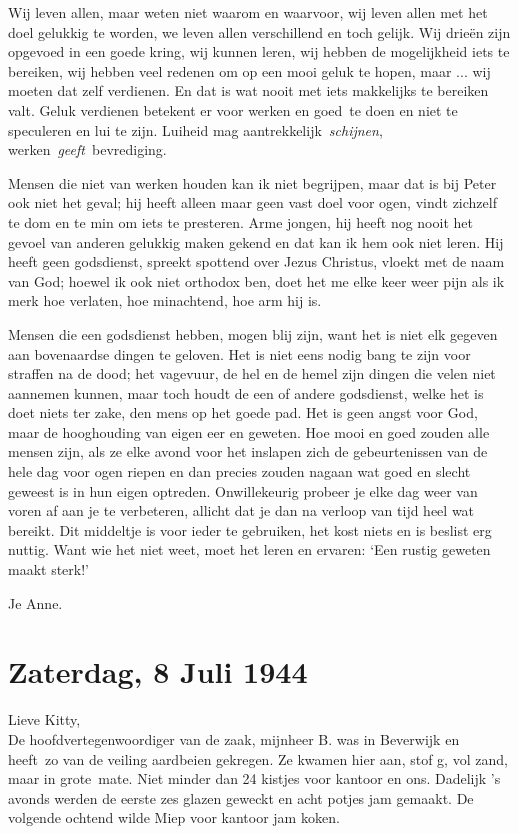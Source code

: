 \documentclass{book}
\begin{document}
Wij leven allen, maar weten niet waarom en waarvoor, wij leven allen met het
doel gelukkig te worden, we leven allen verschillend en toch gelijk.  Wij drieën
zijn opgevoed in een goede kring, wij kunnen leren, wij hebben de mogelijkheid
iets te bereiken, wij hebben veel redenen om op een mooi geluk te hopen, maar
... wij moeten dat zelf verdienen. En dat is wat nooit met iets makkelijks te
bereiken valt. Geluk verdienen betekent er voor werken en goed~te doen en niet
te speculeren en lui te zijn. Luiheid mag aantrekkelijk~\emph{schijnen},
werken~\emph{geeft}~bevrediging.

Mensen die niet van werken houden kan ik niet begrijpen, maar dat is bij Peter
ook niet het geval; hij heeft alleen maar geen vast doel voor ogen, vindt
zichzelf te dom en te min om iets te presteren. Arme jongen, hij heeft nog nooit
het gevoel van anderen gelukkig maken gekend en dat kan ik hem ook niet leren.
Hij heeft geen godsdienst, spreekt spottend over Jezus Christus, vloekt met de
naam van God; hoewel ik ook niet orthodox ben, doet het me elke keer weer pijn
als ik merk hoe verlaten, hoe minachtend, hoe arm hij is.

Mensen die een godsdienst hebben, mogen blij zijn, want het is niet elk gegeven
aan bovenaardse dingen te geloven. Het is niet eens nodig bang te zijn voor
straffen na de dood; het vagevuur, de hel en de hemel zijn dingen die velen niet
aannemen kunnen, maar toch houdt de een of andere godsdienst, welke het is doet
niets ter zake, den mens op het goede pad.  Het is geen angst voor God, maar de
hooghouding van eigen eer en geweten. Hoe mooi en goed zouden alle mensen zijn,
als ze elke avond voor het inslapen zich de gebeurtenissen van de hele dag voor
ogen riepen en dan precies zouden nagaan wat goed en slecht geweest is in hun
eigen optreden. Onwillekeurig probeer je elke dag weer van voren af aan je te
verbeteren, allicht dat je dan na verloop van tijd heel wat bereikt. Dit
middeltje is voor ieder te gebruiken, het kost niets en is beslist erg nuttig.
Want wie het niet weet, moet het leren en ervaren: `Een rustig geweten maakt
sterk!'

Je Anne.

\section*{Zaterdag, 8 Juli 1944}

Lieve Kitty,\\
De hoofdvertegenwoordiger van de zaak, mijnheer B. was in
Beverwijk en heeft~zo van de veiling aardbeien gekregen. Ze kwamen hier aan,
stof g, vol zand, maar in grote~mate. Niet minder dan 24 kistjes voor kantoor en
ons. Dadelijk 's avonds werden de eerste zes glazen geweckt en acht potjes jam
gemaakt. De volgende ochtend wilde Miep voor kantoor jam koken.
\end{document}
